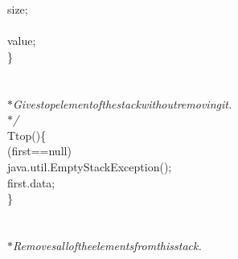 {{\begin{tabbing}
\hspace{48pt}size\dash{}\dash{};\\
\\
\hspace{6pt}value;\\
\hspace{24pt}\}\\
\\
\hspace{24pt}{\it{/$\ast$$\ast$}}\\
{\it{\hspace{30pt}$\ast$\hspace{6pt}Gives\hspace{6pt}top\hspace{6pt}element\hspace{6pt}of\hspace{6pt}the\hspace{6pt}stack\hspace{6pt}without\hspace{6pt}removing\hspace{6pt}it.}}\\
{\it{\hspace{30pt}$\ast$/}}\\
\hspace{6pt}T\hspace{6pt}top()\hspace{6pt}\{\\
(first\hspace{6pt}==\hspace{6pt}null)\\
\makebox[48pt][l]{}\hspace{6pt}java.util.EmptyStackException();\\
\hspace{6pt}first.data;\\
\hspace{24pt}\}\\
\\
\hspace{24pt}{\it{/$\ast$$\ast$}}\\
{\it{\hspace{30pt}$\ast$\hspace{6pt}Removes\hspace{6pt}all\hspace{6pt}of\hspace{6pt}the\hspace{6pt}elements\hspace{6pt}from\hspace{6pt}this\hspace{6pt}stack.}}\\

\end{tabbing}}}
